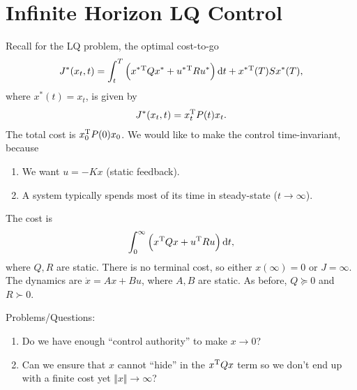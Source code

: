 \section{Infinite Horizon LQ Control}
Recall for the LQ problem, the optimal cost-to-go
\begin{gather}
  J^*(x_t,t) = \int_t^T \Big( x^*{}^\text{T} Qx^* + u^*{}^\text{T} Ru^* \Big)\mathop{}\!\mathrm{d} t + x^*{}^\text{T}(T) S x^*(T),
\end{gather}
where $x^*(t)=x_t$, is given by
\begin{gather}
  J^*(x_t,t) = x_t^\text{T} P(t) x_t.
\end{gather}
The total cost is $x_0^\text{T} P(0) x_0$. We would like to make the control time-invariant, because
\begin{enumerate}[noitemsep]
\item We want $u=-Kx$ (static feedback).
\item A system typically spends most of its time in steady-state ($t\to\infty$).
\end{enumerate}
The cost is
\begin{gather}
  \int_0^\infty \Big( x^\text{T} Qx + u^\text{T} Ru \Big)\mathop{}\!\mathrm{d} t,
\end{gather}
where $Q,R$ are static. There is no terminal cost, so either $x(\infty)=0$ or $J=\infty$. The dynamics are $\dot x = Ax + Bu$, where $A,B$ are static. As before, $Q\succeq0$ and $R\succ0$.

\bigskip\noindent
Problems/Questions:
\begin{enumerate}[nosep]
\item Do we have enough ``control authority'' to make $x\to0$?
\item Can we ensure that $x$ cannot ``hide'' in the $x^\text{T} Qx$ term so we don't end up with a finite cost yet $\Vert x\Vert\to\infty$?
\end{enumerate}

